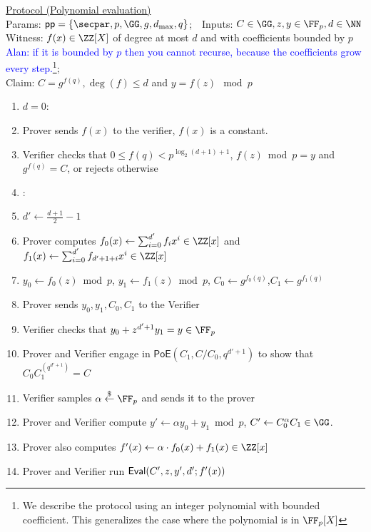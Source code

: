 \documentclass{article}
\theoremstyle{definition}
\begin{document}
\begin{small}
 \begin{minipage}{1.1\textwidth}
\begin{mdframed}[userdefinedwidth=1\textwidth]  \label{prot:Opening}
	\noindent \underline{\textsf{Protocol \eval} (Polynomial evaluation)}\\
\noindent Params: $\crs=\{\secpar,p,\GG,g,d_{\max},q\}$;\ \
Inputs: $C\in \GG,z,y\in \FF_p,d \in \NN $\\
Witness: $f(x) \in \ZZ[X]$ of degree at most $d$ and with coefficients bounded by $p$ \textcolor{blue}{Alan: if it is bounded by $p$ then you cannot recurse, because the coefficients grow every step.}\footnote{We describe the protocol using an integer polynomial with bounded coefficient. This generalizes the case where the polynomial is in $\FF_p[X]$};\\ 
Claim: $C=g^{f(q)},\deg(f)\leq d$ and $y=f(z) \mod p$

\begin{enumerate}[nolistsep]
\item \pcif $d=0$:
\item \pcind[1] Prover sends $f(x)$ to the verifier, $f(x)$ is a constant. 
\item \pcind[1] Verifier checks that $0\leq f(q)<  p^{\log_2(d+1)+1}$,  $f(z) \bmod p=y$ and $g^{f(q)}=C$, or rejects otherwise 
\item \pcelse: 
\item \pcind[1] $d'\gets \frac{d+1}{2}-1$
\item \pcind[1] Prover computes $f_0(x)\gets\sum_{i=0}^{d'} f_i x^i\in \ZZ[x]$ and $f_1(x)\gets\sum_{i=0}^{d'} f_{d'+1+i} x^{i}\in \ZZ[x]$
\item \pcind[1] $y_0\gets f_0(z) \bmod p$, $y_1\gets f_1(z)\bmod p$, $C_0\gets g^{f_0(q)}$,$C_1\gets g^{f_1(q)}$
\item \pcind[1] Prover sends $y_0,y_1,C_0,C_1$ to the Verifier
\item \pcind[1] Verifier checks that $y_0+z^{d'+1} y_1=y\in \FF_p$ 
\item \pcind[1] Prover and Verifier engage in $\textsf{PoE}(C_1,C/C_0,q^{d'+1})$ to show that $C_0C_1^{(q^{d'+1})}=C$
\item \pcind[1] Verifier samples $\alpha \sample \FF_p$ and sends it to the prover
\item \pcind[1] Prover and Verifier compute $y'\gets\alpha y_0 +y_1 \bmod p$, $C'\gets C_0^{\alpha}C_1 \in \GG$. 
\item \pcind[1] Prover also computes $f'(x)\gets\alpha  \cdot f_0(x)+f_1(x) \in \ZZ[x]$ 
\item \pcind[1] Prover and Verifier run $\textsf{{Eval}}(C',z,y',d';f'(x))$
\end{enumerate}
\end{mdframed}
\end{minipage}
\end{small}
\end{document}
